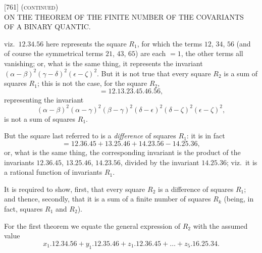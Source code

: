 \documentclass[11pt]{article}
\begin{document}

\begin{center}
\textsc{[761] (continued)}\\[2pt]
\textsc{ON THE THEOREM OF THE FINITE NUMBER OF THE COVARIANTS\\ OF A BINARY QUANTIC.}
\end{center}

\bigskip

\noindent
viz.\ $12.34.56$ here represents the square $R_{1}$, for which the terms
$12$, $34$, $56$ (and of course the symmetrical terms $21$, $43$, $65$) are
each $=1$, the other terms all vanishing; or, what is the same thing, it
represents the invariant $(\alpha-\beta)^{2}(\gamma-\delta)^{2}(\epsilon-\zeta)^{2}$.
But it is not true that every square $R_{2}$ is a sum of squares $R_{1}$;
this is not the case, for the square $R_{2}$,
\[
   = 12.13.23.45.46.56,
\]
representing the invariant
\[
  (\alpha-\beta)^{2}(\alpha-\gamma)^{2}(\beta-\gamma)^{2}
  (\delta-\epsilon)^{2}(\delta-\zeta)^{2}(\epsilon-\zeta)^{2},
\]
is not a sum of squares $R_{1}$.

But the square last referred to is a \emph{difference} of squares $R_{1}$:
it is in fact
\[
  = 12.36.45 + 13.25.46 + 14.23.56 - 14.25.36,
\]
or, what is the same thing, the corresponding invariant is the product of the
invariants $12.36.45$, $13.25.46$, $14.23.56$, divided by the invariant
$14.25.36$; viz.\ it is a rational function of invariants $R_{1}$.

It is required to show, first, that every square $R_{2}$ is a difference of
squares $R_{1}$; and thence, secondly, that it is a sum of a finite number of
squares $R_{k}$ (being, in fact, squares $R_{1}$ and $R_{2}$).

For the first theorem we equate the general expression of $R_{2}$ with the
assumed value
\[
  x_{1}.12.34.56 + y_{1}.12.35.46 + z_{1}.12.36.45 + \ldots + z_{5}.16.25.34.
\]
\end{document}
